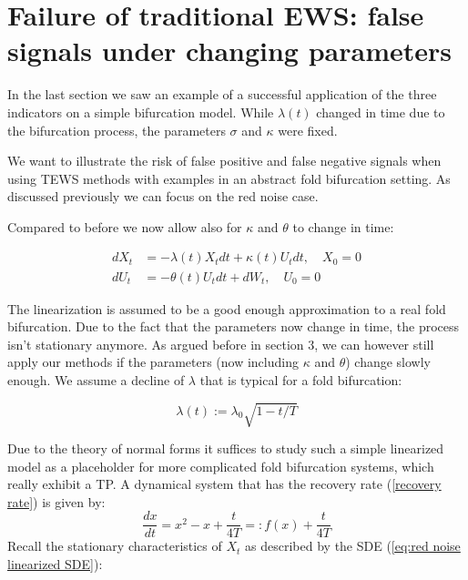 \documentclass[%
thesis=student,%
coverpage=false,%
titlepage=false,%
headmarks=true, %
english,%
font=libertine, %
math=newpxtx, %
BCOR=5mm,%
coverBCOR=11mm%
]{tumbook}
\begin{document}
\chapter{Failure of traditional EWS: false signals  under changing parameters}

In the last section we saw an example of a successful application of the three indicators on a simple bifurcation model. While $\lambda(t)$ changed in time due to the bifurcation process, the parameters $\sigma$ and $\kappa$ were fixed. 

We want to illustrate the risk of false positive and false negative signals when using TEWS methods with examples in an abstract fold bifurcation setting. As discussed previously we can focus on the red noise case.

Compared to before we now allow also for $\kappa$ and $\theta$ to change in time:

    \begin{equation}
    \begin{aligned}
        dX_{t} &= -\lambda(t) X_{t}dt + \kappa(t) U_{t}dt, \quad X_{0} = 0 \\
        dU_{t} &= -\theta(t) U_{t}dt + dW_{t}, \quad U_{0} = 0
    \end{aligned}
    \label{failure of TEWS SDE}
    \end{equation}

The linearization is assumed to be a good enough approximation to a real fold bifurcation. Due to the fact that the parameters now change in time, the process isn't stationary anymore. As argued before in section 3, we can however still apply our methods if the parameters (now including $\kappa$ and $\theta$) change slowly enough.
We assume a decline of $\lambda$ that is typical for a fold bifurcation: 

\begin{equation}
    \lambda(t) := \lambda_{0}\sqrt{1-t/T}
    \label{recovery rate}
\end{equation}
    
Due to the theory of normal forms it suffices to study such a simple linearized model as a placeholder for more complicated fold bifurcation systems, which really exhibit a TP. A dynamical system that has the recovery rate (\ref{recovery rate}) is given by:
\[
\frac{dx}{dt} = x^2 - x + \frac{t}{4T} =: f(x) + \frac{t}{4T}
\]
Recall the stationary characteristics of $X_{t}$ as described by the SDE (\ref{eq:red noise linearized SDE}): 
\end{document}
